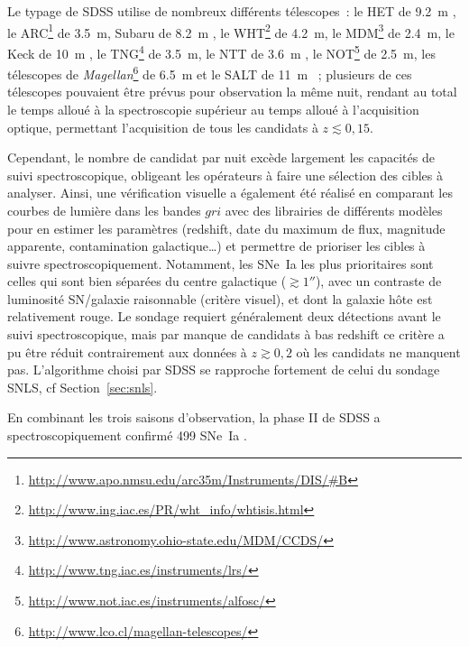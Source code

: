 \documentclass[../main/main.tex]{subfiles}
\begin{document}
Le typage de SDSS utilise de nombreux différents télescopes~: le HET de
\SI{9,2}{m} \citep{hill1998}, le
ARC\footnote{\href{http://www.apo.nmsu.edu/arc35m/Instruments/DIS/\#B}
{http://www.apo.nmsu.edu/arc35m/Instruments/DIS/\#B}} de \SI{3,5}{m}, Subaru de
\SI{8,2}{m} \citep{kashikawa2000}, le
WHT\footnote{\href{http://www.ing.iac.es/PR/wht_info/whtisis.html}
{http://www.ing.iac.es/PR/wht\_info/whtisis.html}} de \SI{4,2}{m}, le
MDM\footnote{\href{http://www.astronomy.ohio-state.edu/MDM/CCDS/}
{http://www.astronomy.ohio-state.edu/MDM/CCDS/}} de \SI{2,4}{m}, le Keck de
\SI{10}{m} \citep{oke1995}, le
TNG\footnote{\href{http://www.tng.iac.es/instruments/lrs/}
{http://www.tng.iac.es/instruments/lrs/}} de \SI{3,5}{m}, le NTT de \SI{3,6}{m}
\citep{dekker1986}, le
NOT\footnote{\href{http://www.not.iac.es/instruments/alfosc/}
{http://www.not.iac.es/instruments/alfosc/}} de \SI{2,5}{m}, les télescopes de
\textit{Magellan}\footnote{\href{http://www.lco.cl/magellan-telescopes/}
{http://www.lco.cl/magellan-telescopes/}} de \SI{6,5}{m} et le SALT de
\SI{11}{m} \citep{burgh2003}~; plusieurs de ces télescopes pouvaient être prévus
pour observation la même nuit, rendant au total le temps alloué à la
spectroscopie supérieur au temps alloué à l'acquisition optique, permettant
l'acquisition de tous les candidats à $z \lesssim 0,15$.

Cependant, le nombre de candidat par nuit excède largement les capacités de
suivi spectroscopique, obligeant les opérateurs à faire une sélection des cibles
à analyser. Ainsi, une vérification visuelle a également été réalisé en
comparant les courbes de lumière dans les bandes $gri$ avec des librairies de
différents modèles pour en estimer les paramètres (redshift, date du maximum de
flux, magnitude apparente, contamination galactique…) et permettre de prioriser
les cibles à suivre spectroscopiquement. Notamment, les SNe~Ia les plus
prioritaires sont celles qui sont bien séparées du centre galactique ($\gtrsim
\ang{;;1}$), avec un contraste de luminosité SN/galaxie raisonnable (critère
visuel), et dont la galaxie hôte est relativement rouge. Le sondage requiert
généralement deux détections avant le suivi spectroscopique, mais par manque de
candidats à bas redshift ce critère a pu être réduit contrairement aux données à
$z \gtrsim 0,2$ où les candidats ne manquent pas. L'algorithme choisi par SDSS
se rapproche fortement de celui du sondage SNLS, cf Section~\ref{sec:snls}.

En combinant les trois saisons d'observation, la phase II de SDSS a
spectroscopiquement confirmé 499 SNe~Ia \citep{sako2018}.
\end{document}

